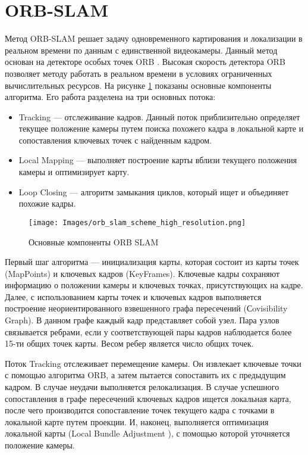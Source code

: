 \documentclass{mipt-thesis-bs}
\begin{document}
\section{ORB-SLAM}
Метод ORB-SLAM \cite{mur2015orb} решает задачу одновременного картирования и локализации в реальном времени по данным с единственной видеокамеры. Данный метод основан на детекторе особых точек ORB \cite{rublee2011orb}. Высокая скорость детектора ORB позволяет методу работать в реальном времени в условиях ограниченных вычислительных ресурсов. На рисунке \ref{figureorbslam} показаны основные компоненты алгоритма. Его работа разделена на три основных потока:
\begin{itemize}
	\item Tracking — отслеживание кадров. Данный поток приблизительно определяет текущее положение камеры путем поиска похожего кадра в локальной карте и сопоставления ключевых точек с найденным кадром.
	\item Local Mapping — выполняет построение карты вблизи текущего положения камеры и оптимизирует карту.
	\item Loop Closing — алгоритм замыкания циклов, который ищет и объединяет похожие кадры.
\end{itemize}

\begin{figure}
	\centering
	\texttt{[image: Images/orb\_slam\_scheme\_high\_resolution.png]}
	\caption{Основные компоненты ORB SLAM}
	\label{figureorbslam}
\end{figure}

Первый шаг алгоритма — инициализация карты, которая состоит из карты точек (MapPoints) и ключевых кадров (KeyFrames). Ключевые кадры сохраняют информацию о положении камеры и ключевых точках, присутствующих на кадре. Далее, с использованием карты точек и ключевых кадров выполняется построение неориентированного взвешенного графа пересечений (Сovisibility Graph). В данном графе каждый кадр представляет собой узел. Пара узлов связывается ребрами, если у соответствующей пары кадров наблюдается более 15-ти общих точек карты. Весом ребер является число общих точек.

Поток Tracking отслеживает перемещение камеры. Он извлекает ключевые точки с помощью алгоритма ORB, а затем пытается сопоставить их с предыдущим кадром. В случае неудачи выполняется релокализация. В случае успешного сопоставления в графе пересечений ключевых кадров ищется локальная карта, после чего производится сопоставление точек текущего кадра с точками в локальной карте путем проекции. И, наконец, выполняется оптимизация локальной карты (Local Bundle Adjustment \cite{zhang2006incremental}), с помощью которой уточняется положение камеры.
\end{document}
